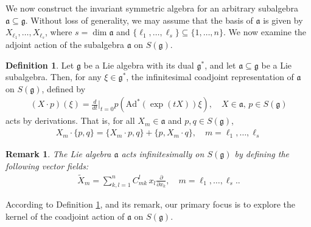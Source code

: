 \documentclass[11pt,reqno]{amsart}
\newtheorem*{theorem A}{Main Theorem A}
\newtheorem*{theorem B}{Main Theorem B}
\newtheorem*{theorem C}{Main Theorem C}
\newtheorem*{theorem D}{Main Theorem D}
\theoremstyle{definition}
\newtheorem{definition}[theorem]{Definition}
\theoremstyle{plain}
\newtheorem{remark}[theorem]{Remark}
\theoremstyle{conclusion}
\begin{document}
 We now construct the invariant symmetric algebra for an arbitrary subalgebra $\mathfrak{a}\subseteq\mathfrak{g}$. Without loss of generality, we may assume that the basis of $\mathfrak{a}$ is given by $X_{\ell_1},\ldots,X_{\ell_s}$, where $s=\dim\mathfrak{a}$ and $\{\ell_1,\ldots,\ell_s\}\subseteq\{1,\ldots,n\}$. %
 We now examine the adjoint action of the subalgebra $\mathfrak{a}$ on $S(\mathfrak{g})$.
 
 \begin{definition}
 \label{def:p2.1}
 Let $\mathfrak{g}$ be a Lie algebra with its dual $\mathfrak{g}^*$, and let $\mathfrak{a}\subseteq\mathfrak{g}$ be a Lie subalgebra. Then, for any $\xi\in\mathfrak{g}^*$, the infinitesimal coadjoint representation of $\mathfrak{a}$ on $S(\mathfrak{g})$, defined by \begin{align*}
     (X\cdot p)(\xi)=\frac{d}{dt}\bigg\vert_{t=0}p(\mathrm{Ad}^*(\exp (tX))\xi) ,\quad X\in\mathfrak{a},\, p\in S(\mathfrak{g}) 
 \end{align*}  acts by derivations.%
 That is, for all $X_m\in\mathfrak{a}$ and $p,q\in S(\mathfrak{g})$,  \begin{align*}
     X_m\cdot\{p,q\}=\{X_m\cdot p,q\}+\{p,X_m\cdot q\}, \quad m = \ell_1,\ldots,\ell_s
 \end{align*} 
 \end{definition}
  \begin{remark}
       The Lie algebra $\mathfrak{a}$ acts infinitesimally on $S(\mathfrak{g})$ by defining the following vector fields: \begin{align}
    \tilde{X}_m=\sum_{k,l=1}^n C_{mk}^l\, x_l\frac{\partial}{\partial x_k},\quad m=\ell_1,\dots,\ell_s.\label{eq:dual}.
\end{align} 
  \end{remark}
 


According to Definition \ref{def:p2.1}, and its remark, our primary focus is to explore the kernel of the coadjoint action of $\mathfrak{a}$ on $S(\mathfrak{g})$.
\end{document}
